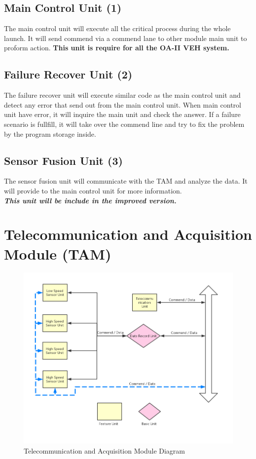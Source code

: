 \documentclass[12pt,article]{memoir}
\begin{document}
\subsection{Main Control Unit (1)}
The main control unit will execute all the critical process during the whole launch. It will send commend via a commend lane to other module main unit to proform action. \textbf{This unit is require for all the OA-II VEH system.}
\subsection{Failure Recover Unit (2)}
The failure recover unit will execute similar code as the main control unit and detect any error that send out from the main control unit. When main control unit have error, it will inquire the main unit and check the answer. If a failure scenario is fullfill, it will take over the commend line and try to fix the problem by the program storage inside.
\subsection{Sensor Fusion Unit (3)}
The sensor fusion unit will communicate with the TAM and analyze the data. It will provide to the main control unit for more information.\\
\textit{\textbf{This unit will be include in the improved version.}}
\clearpage
\section{Telecommunication and Acquisition Module (TAM)}
\begin{figure}[htp]
\includegraphics[width=\textwidth]{img/ES00003_TAMdia.png}
 \caption{Telecommunication and Acquisition Module Diagram}	
\end{figure}
\end{document}
